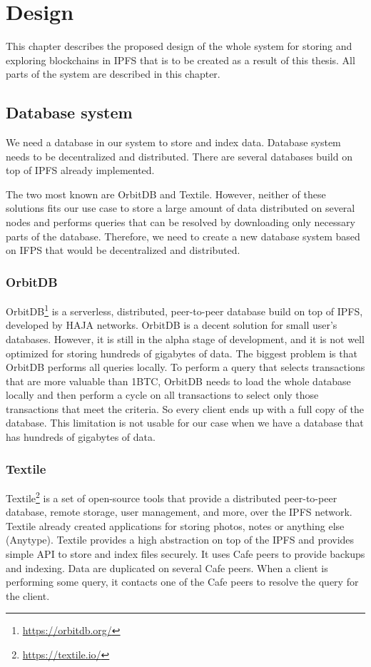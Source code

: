 \chapter{Design}
\label{Design}
This chapter describes the proposed design of the whole system for storing and exploring blockchains in IPFS that is to be created as a result of this thesis. All parts of the system are described in this chapter.

\section{Database system}
We need a database in our system to store and index data. Database system needs to be decentralized and distributed. There are several databases build on top of IPFS already implemented. 

The two most known are OrbitDB and Textile. However, neither of these solutions fits our use case to store a large amount of data distributed on several nodes and performs queries that can be resolved by downloading only necessary parts of the database. Therefore, we need to create a new database system based on IFPS that would be decentralized and distributed. 

\subsection{OrbitDB}
OrbitDB\footnote{\url{https://orbitdb.org/}} \cite{OrbitDBManual} is a serverless, distributed, peer-to-peer database build on top of IPFS, developed by HAJA networks. OrbitDB is a decent solution for small user's databases. However, it is still in the alpha stage of development, and it is not well optimized for storing hundreds of gigabytes of data. The biggest problem is that OrbitDB performs all queries locally. To perform a query that selects transactions that are more valuable than 1BTC, OrbitDB needs to load the whole database locally and then perform a cycle on all transactions to select only those transactions that meet the criteria. So every client ends up with a full copy of the database. This limitation is not usable for our case when we have a database that has hundreds of gigabytes of data.

\subsection{Textile}
Textile\footnote{\url{https://textile.io/}} is a set of open-source tools that provide a distributed peer-to-peer database, remote storage, user management, and more, over the IPFS network. Textile already created applications for storing photos, notes or anything else (Anytype). Textile provides a high abstraction on top of the IPFS and provides simple API to store and index files securely. It uses Cafe peers to provide backups and indexing. Data are duplicated on several Cafe peers. When a client is performing some query, it contacts one of the Cafe peers to resolve the query for the client.
\cite{TextileWhitePaper}

